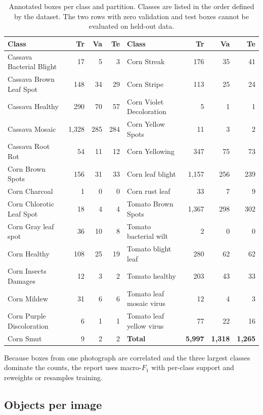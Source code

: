 \documentclass[a4paper,8pt]{article}
\begin{document}
\begin{table}[H]
\centering
\scriptsize
\renewcommand{\arraystretch}{1.08}
\begin{tabularx}{0.95\textwidth}{|X|r|r|r||X|r|r|r|}
\hline
\textbf{Class} & \textbf{Tr} & \textbf{Va} & \textbf{Te} &
\textbf{Class} & \textbf{Tr} & \textbf{Va} & \textbf{Te}\\
\hline
Cassava Bacterial Blight & 17 & 5 & 3 & Corn Streak & 176 & 35 & 41\\
Cassava Brown Leaf Spot & 148 & 34 & 29 & Corn Stripe & 113 & 25 & 24\\
Cassava Healthy & 290 & 70 & 57 & Corn Violet Decoloration & 5 & 1 & 1\\
Cassava Mosaic & 1{,}328 & 285 & 284 & Corn Yellow Spots & 11 & 3 & 2\\
Cassava Root Rot & 54 & 11 & 12 & Corn Yellowing & 347 & 75 & 73\\
Corn Brown Spots & 156 & 31 & 33 & Corn leaf blight & 1{,}157 & 256 & 239\\
Corn Charcoal & 1 & 0 & 0 & Corn rust leaf & 33 & 7 & 9\\
Corn Chlorotic Leaf Spot & 18 & 4 & 4 & Tomato Brown Spots & 1{,}367 & 298 & 302\\
Corn Gray leaf spot & 36 & 10 & 8 & Tomato bacterial wilt & 2 & 0 & 0\\
Corn Healthy & 108 & 25 & 19 & Tomato blight leaf & 280 & 62 & 62\\
Corn Insects Damages & 12 & 3 & 2 & Tomato healthy & 203 & 43 & 33\\
Corn Mildew & 31 & 6 & 6 & Tomato leaf mosaic virus & 12 & 4 & 3\\
Corn Purple Discoloration & 6 & 1 & 1 & Tomato leaf yellow virus & 77 & 22 & 16\\
Corn Smut & 9 & 2 & 2 & \textbf{Total} & \textbf{5{,}997} & \textbf{1{,}318} & \textbf{1{,}265}\\
\hline
\end{tabularx}
\caption{Annotated boxes per class and partition. Classes are listed in the order defined by the
dataset. The two rows with zero validation and test boxes cannot be evaluated on held-out data.}
\label{tab:class-coverage}
\end{table}

Because boxes from one photograph are correlated and the three largest classes dominate the
counts, the report uses macro-$F_1$ with per-class support and reweights or resamples training.

\subsection{Objects per image}
\label{sec:objects-per-image}
\end{document}
